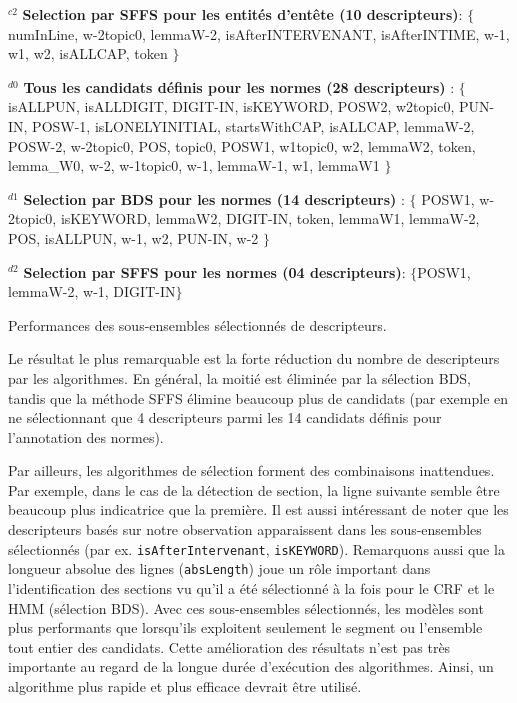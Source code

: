 \begin{table}[!htb]
$^{c2}$ \textbf{Selection par SFFS pour les  entités d'entête (10 descripteurs)}: $\lbrace$ numInLine, w-2topic0, lemmaW-2, isAfterINTERVENANT, isAfterINTIME, w-1, w1, w2, isALLCAP, token $\rbrace$ 

$^{d0}$ \textbf{Tous les candidats définis pour les normes (28 descripteurs)} : $\lbrace$ isALLPUN, isALLDIGIT, DIGIT-IN, isKEYWORD, POSW2, w2topic0, PUN-IN, POSW-1, isLONELYINITIAL, startsWithCAP, isALLCAP, lemmaW-2, POSW-2, w-2topic0, POS, topic0, POSW1, w1topic0, w2, lemmaW2, token, lemma\_W0, w-2, w-1topic0, w-1, lemmaW-1, w1, lemmaW1 $\rbrace$ 

$^{d1}$ \textbf{Selection par BDS pour les normes (14 descripteurs)} : $\lbrace$ POSW1, w-2topic0, isKEYWORD, lemmaW2, DIGIT-IN, token, lemmaW1, lemmaW-2, POS, isALLPUN, w-1, w2, PUN-IN, w-2 $\rbrace$ 

$^{d2}$ \textbf{Selection par SFFS pour les normes (04 descripteurs)}: $\lbrace$POSW1, lemmaW-2, w-1, DIGIT-IN$\rbrace$ 

\caption{Performances des sous-ensembles sélectionnés de descripteurs.}\label{fig:structuration:select-feats}
\end{table}

Le résultat le plus remarquable est la forte réduction du nombre de descripteurs par les algorithmes. En général, la moitié est éliminée par la sélection BDS, tandis que la méthode SFFS élimine beaucoup plus de candidats (par exemple en ne sélectionnant que 4 descripteurs parmi les 14 candidats définis pour l'annotation des normes).

Par ailleurs, les algorithmes de sélection forment des combinaisons inattendues. Par exemple, dans le cas de la détection de section, la ligne suivante semble être beaucoup plus indicatrice que la première. Il est aussi intéressant de noter que les descripteurs basés sur notre observation apparaissent dans les sous-ensembles sélectionnés (par ex. \verb|isAfterIntervenant|, \verb|isKEYWORD|). Remarquons aussi que la longueur absolue des lignes (\verb|absLength|)  joue un rôle important dans l'identification des sections vu qu'il a été sélectionné à la fois pour le CRF et le HMM (sélection BDS). Avec ces sous-ensembles sélectionnés, les modèles sont plus performants que lorsqu'ils exploitent seulement le segment ou l'ensemble tout entier des candidats.  Cette amélioration des résultats n'est pas très importante au regard de la longue durée d'exécution des algorithmes. Ainsi, un algorithme plus rapide et plus efficace devrait être utilisé.


